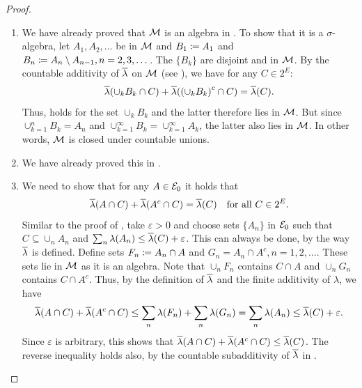 \begin{proof}
	\begin{enumerate}
		\item We have already proved that \(\mathcal{M}\) is an algebra in . To show that it is a \(\sigma\)-algebra, let \(A_1, A_2, \dots\) be in \(\mathcal{M}\) and \(B_1 \coloneqq A_1\) and \(B_n \coloneqq A_n \setminus A_{n-1}, n=2, 3, \dots\). The \(\{B_k\}\) are disjoint and in \(\mathcal{M}\). By the countable additivity of \(\overline{\lambda}\) on \(\mathcal{M}\) (see ), we have for any \(C \in 2^E\):
		      \begin{equation*}
			      \overline{\lambda}(\cup_k B_k \cap C) + \overline{\lambda}({(\cup_k B_k)}^c \cap C) = \overline{\lambda}(C).
		      \end{equation*}
		      Thus,  holds for the set \(\cup_k B_k\) and the latter therefore lies in \(\mathcal{M}\). But since \(\cup_{k=1}^n B_k = A_n\) and \(\cup_{k=1}^\infty B_k = \cup_{k=1}^\infty A_k\), the latter also lies in \(\mathcal{M}\). In other words, \(\mathcal{M}\) is closed under countable unions.

		\item We have already proved this in .

		\item We need to show that for any \(A \in \mathcal{E}_0\) it holds that
		      \begin{equation*}
			      \overline{\lambda}(A \cap C) + \overline{\lambda}(A^c \cap C) = \overline{\lambda}(C) \quad \text{for all } C \in 2^E.
		      \end{equation*}
		      Similar to the proof of , take \(\varepsilon > 0\) and choose sets \(\{A_n\}\) in \(\mathcal{E}_0\) such that \(C \subseteq \cup_n A_n\) and \(\sum_n \lambda(A_n) \le \overline{\lambda}(C) + \varepsilon\). This can always be done, by the way \(\overline{\lambda}\) is defined. Define sets \(F_n \coloneqq A_n \cap A\) and \(G_n = A_n \cap A^c, n=1, 2, \dots\). These sets lie in \(\mathcal{M}\) as it is an algebra. Note that \(\cup_n F_n\) contains \(C \cap A\) and \(\cup_n G_n\) contains \(C \cap A^c\). Thus, by the definition of \(\overline{\lambda}\) and the finite additivity of \(\lambda\), we have
		      \begin{equation*}
			      \overline{\lambda}(A \cap C) + \overline{\lambda}(A^c \cap C) \le \sum_n \lambda(F_n) + \sum_n \lambda(G_n) = \sum_n \lambda(A_n) \le \overline{\lambda}(C) + \varepsilon.
		      \end{equation*}
		      Since \(\varepsilon\) is arbitrary, this shows that \(\overline{\lambda}(A \cap C) + \overline{\lambda}(A^c \cap C) \le \overline{\lambda}(C)\). The reverse inequality holds also, by the countable subadditivity of \(\overline{\lambda}\) in .


\end{enumerate}
\end{proof}
